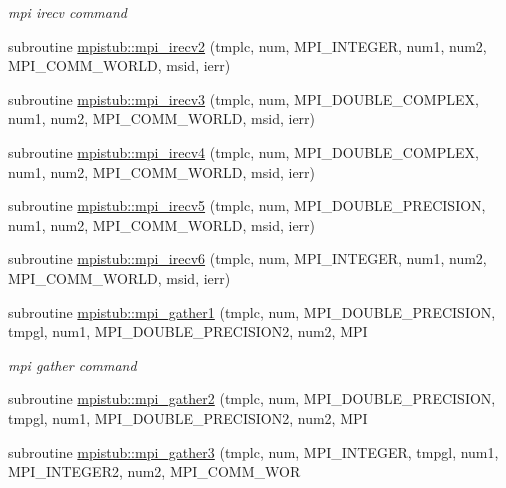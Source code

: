 \begin{DoxyCompactItemize}
\begin{DoxyCompactList}\small\item\em mpi irecv command \end{DoxyCompactList}\item 
subroutine \mbox{\hyperlink{namespacempistub_a3f6d6a1e356cf0bed0327c5b9df47498}{mpistub\+::mpi\+\_\+irecv2}} (tmplc, num, M\+P\+I\+\_\+\+I\+N\+T\+E\+G\+ER, num1, num2, M\+P\+I\+\_\+\+C\+O\+M\+M\+\_\+\+W\+O\+R\+LD, msid, ierr)
\item 
subroutine \mbox{\hyperlink{namespacempistub_ad39ca4d74dbf2a6bc63895fa2503e945}{mpistub\+::mpi\+\_\+irecv3}} (tmplc, num, M\+P\+I\+\_\+\+D\+O\+U\+B\+L\+E\+\_\+\+C\+O\+M\+P\+L\+EX, num1, num2, M\+P\+I\+\_\+\+C\+O\+M\+M\+\_\+\+W\+O\+R\+LD, msid, ierr)
\item 
subroutine \mbox{\hyperlink{namespacempistub_a99d8cacbf221fe5a3829f6dbc22159a6}{mpistub\+::mpi\+\_\+irecv4}} (tmplc, num, M\+P\+I\+\_\+\+D\+O\+U\+B\+L\+E\+\_\+\+C\+O\+M\+P\+L\+EX, num1, num2, M\+P\+I\+\_\+\+C\+O\+M\+M\+\_\+\+W\+O\+R\+LD, msid, ierr)
\item 
subroutine \mbox{\hyperlink{namespacempistub_a42635e07cedd999352dec8ee45a378f5}{mpistub\+::mpi\+\_\+irecv5}} (tmplc, num, M\+P\+I\+\_\+\+D\+O\+U\+B\+L\+E\+\_\+\+P\+R\+E\+C\+I\+S\+I\+ON, num1, num2, M\+P\+I\+\_\+\+C\+O\+M\+M\+\_\+\+W\+O\+R\+LD, msid, ierr)
\item 
subroutine \mbox{\hyperlink{namespacempistub_a38d4bf89b91c8dac22d310c6e73ced41}{mpistub\+::mpi\+\_\+irecv6}} (tmplc, num, M\+P\+I\+\_\+\+I\+N\+T\+E\+G\+ER, num1, num2, M\+P\+I\+\_\+\+C\+O\+M\+M\+\_\+\+W\+O\+R\+LD, msid, ierr)
\item 
subroutine \mbox{\hyperlink{namespacempistub_a3e61dfb24d3caebd2c2983a9e4ab3dfd}{mpistub\+::mpi\+\_\+gather1}} (tmplc, num, M\+P\+I\+\_\+\+D\+O\+U\+B\+L\+E\+\_\+\+P\+R\+E\+C\+I\+S\+I\+ON, tmpgl, num1, M\+P\+I\+\_\+\+D\+O\+U\+B\+L\+E\+\_\+\+P\+R\+E\+C\+I\+S\+I\+O\+N2, num2, M\+PI
\begin{DoxyCompactList}\small\item\em mpi gather command \end{DoxyCompactList}\item 
subroutine \mbox{\hyperlink{namespacempistub_a9be56b07b004daadf8c9baeb3f79a9eb}{mpistub\+::mpi\+\_\+gather2}} (tmplc, num, M\+P\+I\+\_\+\+D\+O\+U\+B\+L\+E\+\_\+\+P\+R\+E\+C\+I\+S\+I\+ON, tmpgl, num1, M\+P\+I\+\_\+\+D\+O\+U\+B\+L\+E\+\_\+\+P\+R\+E\+C\+I\+S\+I\+O\+N2, num2, M\+PI
\item 
subroutine \mbox{\hyperlink{namespacempistub_a4a5262ac6eca022843c0cd39b508e35f}{mpistub\+::mpi\+\_\+gather3}} (tmplc, num, M\+P\+I\+\_\+\+I\+N\+T\+E\+G\+ER, tmpgl, num1, M\+P\+I\+\_\+\+I\+N\+T\+E\+G\+E\+R2, num2, M\+P\+I\+\_\+\+C\+O\+M\+M\+\_\+\+W\+OR

\end{DoxyCompactItemize}

